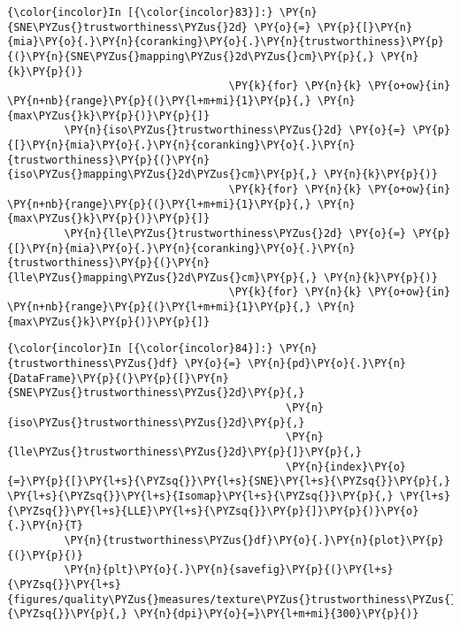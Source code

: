     \begin{Verbatim}[commandchars=\\\{\}]
{\color{incolor}In [{\color{incolor}83}]:} \PY{n}{SNE\PYZus{}trustworthiness\PYZus{}2d} \PY{o}{=} \PY{p}{[}\PY{n}{mia}\PY{o}{.}\PY{n}{coranking}\PY{o}{.}\PY{n}{trustworthiness}\PY{p}{(}\PY{n}{SNE\PYZus{}mapping\PYZus{}2d\PYZus{}cm}\PY{p}{,} \PY{n}{k}\PY{p}{)}
                                   \PY{k}{for} \PY{n}{k} \PY{o+ow}{in} \PY{n+nb}{range}\PY{p}{(}\PY{l+m+mi}{1}\PY{p}{,} \PY{n}{max\PYZus{}k}\PY{p}{)}\PY{p}{]}
         \PY{n}{iso\PYZus{}trustworthiness\PYZus{}2d} \PY{o}{=} \PY{p}{[}\PY{n}{mia}\PY{o}{.}\PY{n}{coranking}\PY{o}{.}\PY{n}{trustworthiness}\PY{p}{(}\PY{n}{iso\PYZus{}mapping\PYZus{}2d\PYZus{}cm}\PY{p}{,} \PY{n}{k}\PY{p}{)}
                                   \PY{k}{for} \PY{n}{k} \PY{o+ow}{in} \PY{n+nb}{range}\PY{p}{(}\PY{l+m+mi}{1}\PY{p}{,} \PY{n}{max\PYZus{}k}\PY{p}{)}\PY{p}{]}
         \PY{n}{lle\PYZus{}trustworthiness\PYZus{}2d} \PY{o}{=} \PY{p}{[}\PY{n}{mia}\PY{o}{.}\PY{n}{coranking}\PY{o}{.}\PY{n}{trustworthiness}\PY{p}{(}\PY{n}{lle\PYZus{}mapping\PYZus{}2d\PYZus{}cm}\PY{p}{,} \PY{n}{k}\PY{p}{)}
                                   \PY{k}{for} \PY{n}{k} \PY{o+ow}{in} \PY{n+nb}{range}\PY{p}{(}\PY{l+m+mi}{1}\PY{p}{,} \PY{n}{max\PYZus{}k}\PY{p}{)}\PY{p}{]}
\end{Verbatim}

    \begin{Verbatim}[commandchars=\\\{\}]
{\color{incolor}In [{\color{incolor}84}]:} \PY{n}{trustworthiness\PYZus{}df} \PY{o}{=} \PY{n}{pd}\PY{o}{.}\PY{n}{DataFrame}\PY{p}{(}\PY{p}{[}\PY{n}{SNE\PYZus{}trustworthiness\PYZus{}2d}\PY{p}{,}
                                            \PY{n}{iso\PYZus{}trustworthiness\PYZus{}2d}\PY{p}{,}
                                            \PY{n}{lle\PYZus{}trustworthiness\PYZus{}2d}\PY{p}{]}\PY{p}{,}
                                            \PY{n}{index}\PY{o}{=}\PY{p}{[}\PY{l+s}{\PYZsq{}}\PY{l+s}{SNE}\PY{l+s}{\PYZsq{}}\PY{p}{,} \PY{l+s}{\PYZsq{}}\PY{l+s}{Isomap}\PY{l+s}{\PYZsq{}}\PY{p}{,} \PY{l+s}{\PYZsq{}}\PY{l+s}{LLE}\PY{l+s}{\PYZsq{}}\PY{p}{]}\PY{p}{)}\PY{o}{.}\PY{n}{T}
         \PY{n}{trustworthiness\PYZus{}df}\PY{o}{.}\PY{n}{plot}\PY{p}{(}\PY{p}{)}
         \PY{n}{plt}\PY{o}{.}\PY{n}{savefig}\PY{p}{(}\PY{l+s}{\PYZsq{}}\PY{l+s}{figures/quality\PYZus{}measures/texture\PYZus{}trustworthiness\PYZus{}2d.png}\PY{l+s}{\PYZsq{}}\PY{p}{,} \PY{n}{dpi}\PY{o}{=}\PY{l+m+mi}{300}\PY{p}{)}
\end{Verbatim}

